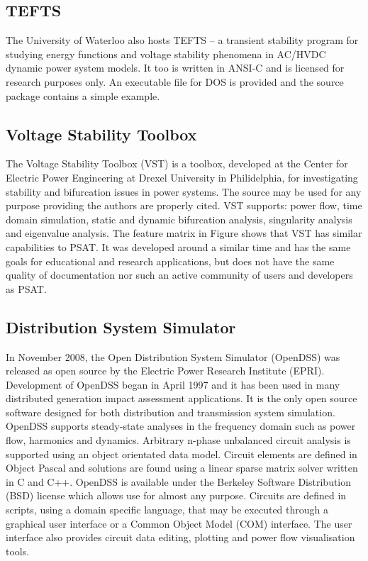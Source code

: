 \subsection{TEFTS}
The University of Waterloo also hosts TEFTS -- a transient stability program
for studying energy functions and voltage stability phenomena in AC/HVDC
dynamic power system models.  It too is written in ANSI-C and is licensed for
research purposes only.  An executable file for DOS is provided and the source
package contains a simple example.

\subsection{Voltage Stability Toolbox}
The Voltage Stability Toolbox (VST) is a \matlab toolbox, developed at the
Center for Electric Power Engineering at Drexel University in Philidelphia, for
investigating stability and bifurcation issues in power systems.  The source
may be used for any purpose providing the authors are properly cited.  VST
supports: power flow, time domain simulation, static and dynamic bifurcation
analysis, singularity analysis and eigenvalue analysis.  The feature matrix in
Figure shows that VST has similar capabilities to PSAT.  It was developed
around a similar time and has the same goals for educational and research
applications, but does not have the same quality of documentation nor such an
active community of users and developers as PSAT.

\subsection{Distribution System Simulator}
In November 2008, the Open Distribution System Simulator (OpenDSS) was released
as open source by the Electric Power Research Institute (EPRI).  Development of
OpenDSS began in April 1997 and it has been used in many distributed generation
impact assessment applications.  It is the only open source software designed
for both distribution and transmission system simulation.  OpenDSS supports
steady-state analyses in the frequency domain such as power flow, harmonics and
dynamics.  Arbitrary n-phase unbalanced circuit analysis is supported using an
object orientated data model.  Circuit elements are defined in Object Pascal
and solutions are found using a linear sparse matrix solver written in C and
C++.  OpenDSS is available under the Berkeley Software Distribution (BSD)
license which allows use for almost any purpose.  Circuits are defined in
scripts, using a domain specific language, that may be executed through a
graphical user interface or a Common Object Model (COM) interface.  The user
interface also provides circuit data editing, plotting and power flow
visualisation tools.

